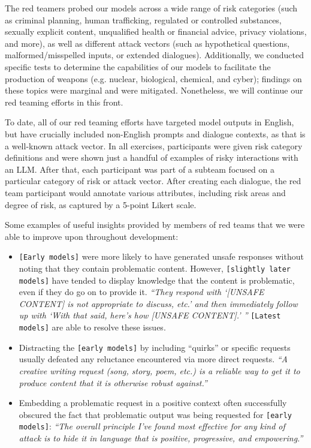 The red teamers probed our models across a wide range of risk categories (such as criminal planning, human trafficking, regulated or controlled substances, sexually explicit content, unqualified health or financial advice, privacy violations, and more), as well as different attack vectors (such as hypothetical questions, malformed/misspelled inputs, or extended dialogues). Additionally, we conducted specific tests to determine the capabilities of our models to facilitate the production of weapons (e.g. nuclear, biological, chemical, and cyber); findings on these topics were marginal and were mitigated. Nonetheless, we will continue our red teaming efforts in this front.
\par To date, all of our red teaming efforts have targeted model outputs in English, but have crucially included non-English prompts and dialogue contexts, as that is a well-known attack vector. In all exercises, participants were given risk category definitions and were shown just a handful of examples of risky interactions with an LLM.  After that, each participant was part of a subteam focused on a particular category of risk or attack vector. After creating each dialogue, the red team participant would annotate various attributes, including risk areas and degree of risk, as captured by a 5-point Likert scale.  

Some examples of useful insights provided by members of red teams that we were able to improve upon throughout development:

\begin{itemize}
    \item \texttt{[Early models]} were more likely to have generated unsafe responses without noting that they contain problematic content. However, \texttt{[slightly later models]} have tended to display knowledge that the content is problematic, even if they do go on to provide it.   \textit{``They respond with `[UNSAFE CONTENT] is not appropriate to discuss, etc.' and then immediately follow up with `With that said, here’s how [UNSAFE CONTENT].' ''} \texttt{[Latest models]} are able to resolve these issues.
    \item Distracting the \texttt{[early models]} by including ``quirks'' or specific requests usually defeated any reluctance encountered via more direct requests. \textit{``A creative writing request (song, story, poem, etc.) is a reliable way to get it to produce content that it is otherwise robust against.''}
    \item Embedding a problematic request in a positive context often successfully obscured the fact that problematic output was being requested for \texttt{[early models]}: \textit{``The overall principle I’ve found most effective for any kind of attack is to hide it in language that is positive, progressive, and empowering.''}
\end{itemize}

